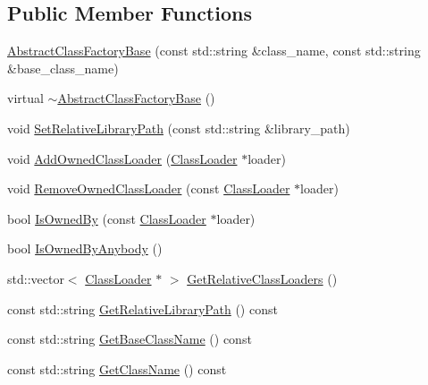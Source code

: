 \subsection*{Public Member Functions}
\begin{DoxyCompactItemize}
\item 
\hyperlink{classapollo_1_1cyber_1_1class__loader_1_1utility_1_1AbstractClassFactoryBase_ae205a32cbe37f7b8ca778ca405852aaf}{Abstract\-Class\-Factory\-Base} (const std\-::string \&class\-\_\-name, const std\-::string \&base\-\_\-class\-\_\-name)
\item 
virtual \hyperlink{classapollo_1_1cyber_1_1class__loader_1_1utility_1_1AbstractClassFactoryBase_a1a9e03fefa1d1911c8c2a92762044b54}{$\sim$\-Abstract\-Class\-Factory\-Base} ()
\item 
void \hyperlink{classapollo_1_1cyber_1_1class__loader_1_1utility_1_1AbstractClassFactoryBase_a55d911877a8e8586d93abbdd90329d6f}{Set\-Relative\-Library\-Path} (const std\-::string \&library\-\_\-path)
\item 
void \hyperlink{classapollo_1_1cyber_1_1class__loader_1_1utility_1_1AbstractClassFactoryBase_a72444d8d01b94d17b8b1782bb6073872}{Add\-Owned\-Class\-Loader} (\hyperlink{classapollo_1_1cyber_1_1class__loader_1_1ClassLoader}{Class\-Loader} $\ast$loader)
\item 
void \hyperlink{classapollo_1_1cyber_1_1class__loader_1_1utility_1_1AbstractClassFactoryBase_aa57fd78d52ebc1f9fb1214498c0be2e7}{Remove\-Owned\-Class\-Loader} (const \hyperlink{classapollo_1_1cyber_1_1class__loader_1_1ClassLoader}{Class\-Loader} $\ast$loader)
\item 
bool \hyperlink{classapollo_1_1cyber_1_1class__loader_1_1utility_1_1AbstractClassFactoryBase_ae1471153574b83c4f4205c6ad55174c6}{Is\-Owned\-By} (const \hyperlink{classapollo_1_1cyber_1_1class__loader_1_1ClassLoader}{Class\-Loader} $\ast$loader)
\item 
bool \hyperlink{classapollo_1_1cyber_1_1class__loader_1_1utility_1_1AbstractClassFactoryBase_a6212125ab8292eee20a0bd58d4a0ba1d}{Is\-Owned\-By\-Anybody} ()
\item 
std\-::vector$<$ \hyperlink{classapollo_1_1cyber_1_1class__loader_1_1ClassLoader}{Class\-Loader} $\ast$ $>$ \hyperlink{classapollo_1_1cyber_1_1class__loader_1_1utility_1_1AbstractClassFactoryBase_a287a1480163fa6254148eb74947292be}{Get\-Relative\-Class\-Loaders} ()
\item 
const std\-::string \hyperlink{classapollo_1_1cyber_1_1class__loader_1_1utility_1_1AbstractClassFactoryBase_ac538fd1b4f313d2a47c6748b983d04ea}{Get\-Relative\-Library\-Path} () const 
\item 
const std\-::string \hyperlink{classapollo_1_1cyber_1_1class__loader_1_1utility_1_1AbstractClassFactoryBase_a47971dd0e73299250ea338dc927b3e90}{Get\-Base\-Class\-Name} () const 
\item 
const std\-::string \hyperlink{classapollo_1_1cyber_1_1class__loader_1_1utility_1_1AbstractClassFactoryBase_a4033b25aebc159a72555e5079d09a5cf}{Get\-Class\-Name} () const 
\end{DoxyCompactItemize}
